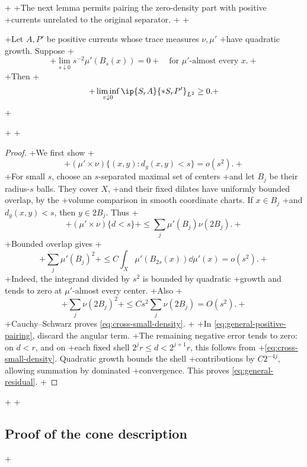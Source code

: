 +
+The next lemma permits pairing the zero-density part with positive
+currents unrelated to the original separator.
+
+\begin{lemma}\label{lem:general-residual}
+Let \(A,P'\) be positive currents whose trace measures \(\nu,\mu'\)
+have quadratic growth. Suppose
+\[
+ \lim_{s\downarrow0}s^{-2}\mu'(B_s(x))=0
+ \quad\text{for }\mu'\text{-almost every }x.
+\]
+Then
+\begin{equation}\label{eq:general-residual}
+ \liminf_{r\downarrow0}\ip{S_rA}{*S_rP'}_{L^2}\ge0.
+\end{equation}
+\end{lemma}
+
+\begin{proof}
+We first show
+\begin{equation}\label{eq:cross-small-density}
+ (\mu'\times\nu)\{(x,y):d_g(x,y)<s\}=o(s^2).
+\end{equation}
+For small \(s\), choose an \(s\)-separated maximal set of centers
+and let \(B_j\) be their radius-\(s\) balls. They cover \(X\),
+and their fixed dilates have uniformly bounded overlap, by the
+volume comparison in smooth coordinate charts. If \(x\in B_j\)
+and \(d_g(x,y)<s\), then \(y\in2B_j\). Thus
+\[
+ (\mu'\times\nu)\{d<s\}
+ \le\sum_j\mu'(B_j)\nu(2B_j).
+\]
+Bounded overlap gives
+\[
+ \sum_j\mu'(B_j)^2
+ \le C\int_X\mu'(B_{2s}(x))\dd\mu'(x)=o(s^2).
+\]
+Indeed, the integrand divided by \(s^2\) is bounded by quadratic
+growth and tends to zero at \(\mu'\)-almost every center.
+Also
+\[
+ \sum_j\nu(2B_j)^2
+ \le Cs^2\sum_j\nu(2B_j)=O(s^2).
+\]
+Cauchy--Schwarz proves \eqref{eq:cross-small-density}.
+
+In \eqref{eq:general-positive-pairing}, discard the angular term.
+The remaining negative error tends to zero: on \(d<r\), and on
+each fixed shell \(2^jr\le d<2^{j+1}r\), this follows from
+\eqref{eq:cross-small-density}. Quadratic growth bounds the shell
+contributions by \(C2^{-4j}\), allowing summation by dominated
+convergence. This proves \eqref{eq:general-residual}.
+\end{proof}
+
+\subsection{Proof of the cone description}
+
